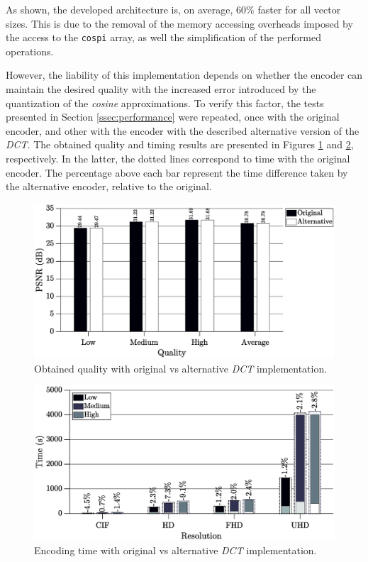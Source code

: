 As shown, the developed architecture is, on average, $60\%$ faster for all vector sizes. This is due to the removal of the memory accessing overheads imposed by the access to the \texttt{cospi} array, as well the simplification of the performed operations. 

However, the liability of this implementation depends on whether the encoder can maintain the desired quality with the increased error introduced by the quantization of the \emph{cosine} approximations. To verify this factor, the tests presented in Section \ref{ssec:performance} were repeated, once with the original encoder, and other with the encoder with the described alternative version of the \emph{DCT}. The obtained quality and timing results are presented in Figures \ref{fig:buttqual} and \ref{fig:butttime}, respectively. In the latter, the dotted lines correspond to time with the original encoder. The percentage above each bar represent the time difference taken by the alternative encoder, relative to the original.

\begin{figure}[!htpb]
    \centering
    \includegraphics[width=\textwidth]{Sections/4DevelopedArchitecture/Figures/buttmultqual.eps}
    \caption{Obtained quality with original vs alternative \emph{DCT} implementation.}
    \label{fig:buttqual}
\end{figure}

\begin{figure}[!htpb]
    \centering
    \includegraphics[width=\textwidth]{Sections/4DevelopedArchitecture/Figures/buttmulttime.eps}
    \caption{Encoding time with original vs alternative \emph{DCT} implementation.}
    \label{fig:butttime}
\end{figure}

